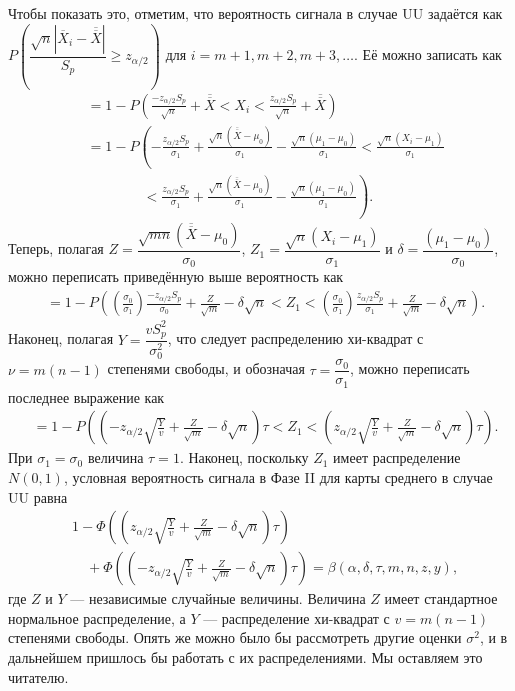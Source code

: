 Чтобы показать это, отметим, что вероятность сигнала в случае UU задаётся как \(P\left(\dfrac{\sqrt{n}|\overline{X}_i - \overline{\overline{X}}|}{S_p} \ge z_{\alpha/2}\right)\) для \(i = m + 1, m + 2, m + 3, \ldots\). Её можно записать как
\[
\begin{aligned}
	&= 1 - P\left(\frac{-z_{\alpha/2}S_p}{\sqrt{n}} + \overline{\overline{X}} < X_i
	< \frac{z_{\alpha/2}S_p}{\sqrt{n}} + \overline{\overline{X}}\right) \\
	&= 1 - P\left(-\frac{z_{\alpha/2}S_p}{\sigma_1} + \frac{\sqrt{n}(\overline{\overline{X}} - \mu_0)}{\sigma_1}
	- \frac{\sqrt{n}(\mu_1 - \mu_0)}{\sigma_1} < \frac{\sqrt{n}(X_i - \mu_1)}{\sigma_1} \right.\\
	&\qquad\qquad \left.< \frac{z_{\alpha/2}S_p}{\sigma_1} + \frac{\sqrt{n}(\overline{\overline{X}} - \mu_0)}{\sigma_1}
	- \frac{\sqrt{n}(\mu_1 - \mu_0)}{\sigma_1}\right).
\end{aligned}
\]
Теперь, полагая \(Z = \dfrac{\sqrt{mn}(\overline{\overline{X}} - \mu_0)}{\sigma_0}\), \(Z_1 = \dfrac{\sqrt{n}(X_i - \mu_1)}{\sigma_1}\) и \(\delta = \dfrac{(\mu_1 - \mu_0)}{\sigma_0}\), можно переписать приведённую выше вероятность как
\[
\begin{aligned}
	&= 1 - P\left(\left(\frac{\sigma_0}{\sigma_1}\right)\frac{-z_{\alpha/2}S_p}{\sigma_0} + \frac{Z}{\sqrt{m}} - \delta\sqrt{n} < Z_1
	< \left(\frac{\sigma_0}{\sigma_1}\right)\frac{z_{\alpha/2}S_p}{\sigma_1} + \frac{Z}{\sqrt{m}} - \delta\sqrt{n}\right).
\end{aligned}
\]
Наконец, полагая \(Y = \dfrac{vS_p^2}{\sigma_0^2}\), что следует распределению хи-квадрат с \(\nu = m(n - 1)\) степенями свободы, и обозначая \(\tau = \dfrac{\sigma_0}{\sigma_1}\), можно переписать последнее выражение как
\[
\begin{aligned}
	&= 1 - P\left(\left(-z_{\alpha/2}\sqrt{\frac{Y}{v}} + \frac{Z}{\sqrt{m}} - \delta\sqrt{n}\right)\tau < Z_1
	< \left(z_{\alpha/2}\sqrt{\frac{Y}{v}} + \frac{Z}{\sqrt{m}} - \delta\sqrt{n}\right)\tau\right).
\end{aligned}
\]
При \(\sigma_1 = \sigma_0\) величина \(\tau = 1\). Наконец, поскольку \(Z_1\) имеет распределение \(N(0,1)\), условная вероятность сигнала в Фазе II для карты среднего в случае UU равна
\[
\begin{aligned}
	&1 - \Phi\left(\left(z_{\alpha/2}\sqrt{\frac{Y}{v}} + \frac{Z}{\sqrt{m}} - \delta\sqrt{n}\right)\tau\right) \\
	&\quad + \Phi\left(\left(-z_{\alpha/2}\sqrt{\frac{Y}{v}} + \frac{Z}{\sqrt{m}} - \delta\sqrt{n}\right)\tau\right)
	= \beta(\alpha, \delta, \tau, m, n, z, y),
\end{aligned}
\]
где \(Z\) и \(Y\) — независимые случайные величины. Величина \(Z\) имеет стандартное нормальное распределение, а \(Y\) — распределение хи-квадрат с \(v = m(n - 1)\) степенями свободы. Опять же можно было бы рассмотреть другие оценки \(\sigma^2\), и в дальнейшем пришлось бы работать с их распределениями. Мы оставляем это читателю.

